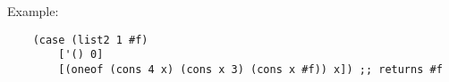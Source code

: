 \documentclass[]{article}
\begin{document}
Example: 
\begin{verbatim}
    (case (list2 1 #f)
        ['() 0]
        [(oneof (cons 4 x) (cons x 3) (cons x #f)) x]) ;; returns #f
\end{verbatim}







\end{document}
